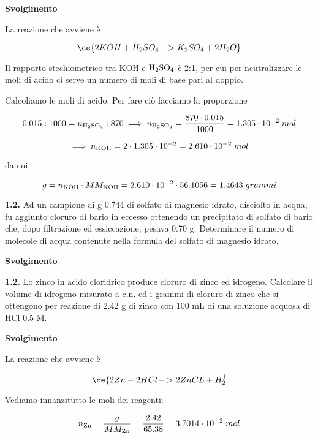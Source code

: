 \vspace{0.2cm}\large\textbf{Svolgimento}\normalsize

\vspace{0.2cm}La reazione che avviene è

$$\ce{2KOH + H_2SO_4 -> K_2SO_4 + 2H_2O}$$

Il rapporto stechiometrico tra KOH e $\rm H_2SO_4$ è 2:1, per cui per neutralizzare le moli di acido ci serve un numero di moli di base pari al doppio.

Calcoliamo le moli di acido. Per fare ciò facciamo la proporzione

$$0.015:1000=n_{\rm H_2SO_4}:870
\implies
n_{\rm H_2SO_4}=\frac{870 \cdot 0.015}{1000}=1.305 \cdot 10^{-2}\;mol$$

$$\implies n_{\rm KOH}=2 \cdot 1.305 \cdot 10^{-2}=2.610 \cdot 10^{-2}\;mol$$

da cui

$$g=n_{\rm KOH} \cdot MM_{\rm KOH}
=2.610 \cdot 10^{-2} \cdot 56.1056
=1.4643\;grammi$$

\vspace{0.2cm}\textbf{1.2.} Ad un campione di g 0.744 di solfato di magnesio idrato, disciolto in acqua, fu aggiunto cloruro di bario in eccesso ottenendo un precipitato di solfato di bario che, dopo filtrazione ed essiccazione, pesava 0.70 g. Determinare il numero di molecole di acqua contenute nella formula del solfato di magnesio idrato.

\vspace{0.2cm}\large\textbf{Svolgimento}\normalsize

\vspace{0.2cm}

\vspace{0.2cm}\textbf{1.2.} Lo zinco in acido cloridrico produce cloruro di zinco ed idrogeno. Calcolare il volume di
idrogeno misurato a c.n. ed i grammi di cloruro di zinco che si ottengono per reazione di 2.42 g di zinco con 100 mL di una soluzione acquosa di HCl 0.5 M.

\vspace{0.2cm}\large\textbf{Svolgimento}\normalsize

\vspace{0.2cm}La reazione che avviene è

$$\ce{2Zn + 2HCl -> 2ZnCL + H_2 ^}$$

Vediamo innanzitutto le moli dei reagenti:

$$n_{\rm Zn}=\frac{g}{MM_{\rm Zn}}=\frac{2.42}{65.38}=3.7014 \cdot 10^{-2}\;mol$$

